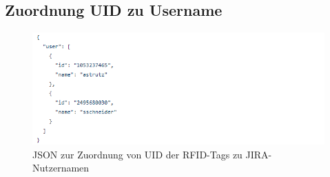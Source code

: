 \documentclass[12pt,titlepage]{scrartcl}
\begin{document}
\begin{appendix}
 	 	 	\subsection{Zuordnung UID zu Username} \label{ANHUser}
 	 	 		\begin{figure}[H] 
  					\centering
    				\includegraphics[height=0.3\textheight]{rfidUser}
  					\caption{JSON zur Zuordnung von UID der RFID-Tags zu JIRA-Nutzernamen}
  					\label{fig:ANHUser}
				\end{figure}
 	 	\newpage

\end{appendix}
\end{document}
